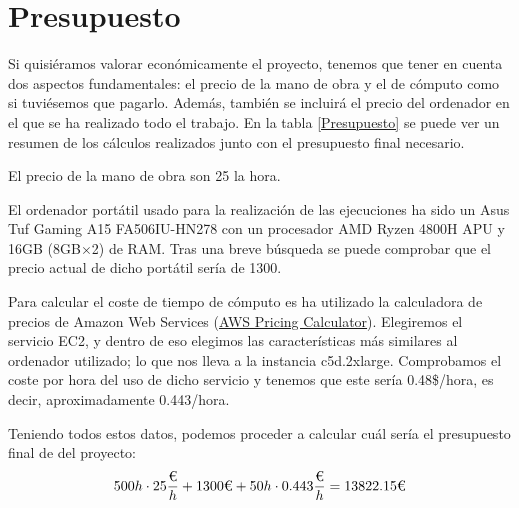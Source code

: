 \section{Presupuesto}

Si quisiéramos valorar económicamente el proyecto, tenemos que tener en cuenta dos aspectos fundamentales: el precio de la mano de obra y el de cómputo como si tuviésemos que pagarlo. 
Además, también se incluirá el precio del ordenador en el que se ha realizado todo el trabajo. 
En la tabla \ref{Presupuesto} se puede ver un resumen de los cálculos realizados junto con el presupuesto final necesario.

El precio de la mano de obra son 25\texteuro\xspace la hora. 

El ordenador portátil usado para la realización de las ejecuciones ha sido un Asus Tuf Gaming A15 FA506IU-HN278 con un procesador AMD\textregistered\xspace Ryzen\texttrademark\xspace 7 4800H APU
y 16GB (8GB$\times$2) de RAM. 
Tras una breve búsqueda se puede comprobar que el precio actual de dicho portátil sería de 1300\texteuro\xspace. 

Para calcular el coste de tiempo de cómputo es ha utilizado la calculadora de precios de Amazon Web Services (\href{https://calculator.aws}{AWS Pricing Calculator}). 
Elegiremos el servicio EC2, y dentro de eso elegimos las características más similares al ordenador utilizado; lo que nos lleva a la instancia c5d.2xlarge. 
Comprobamos el coste por hora del uso de dicho servicio y tenemos que este sería 0.48\$/hora, es decir, aproximadamente 0.443\texteuro /hora.

Teniendo todos estos datos, podemos proceder a calcular cuál sería el presupuesto final de del proyecto:
\begin{equation*}
500h\cdot 25\dfrac{\text{\texteuro}}{h} + 1300\text{\texteuro} + 50h\cdot 0.443\dfrac{\text{\texteuro}}{h} = 13822.15\text{\texteuro}
\end{equation*}


